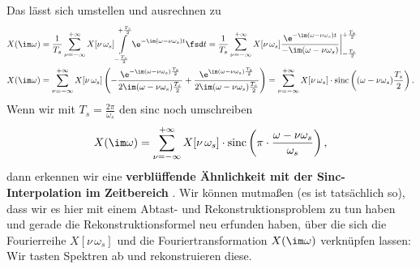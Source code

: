 Das lässt sich umstellen und ausrechnen zu
\begin{align}
&X(\im\omega) = \frac{1}{T_s}\sum_{\nu=-\infty}^{+\infty} X[\nu\,\omega_s]
\int\limits_{-\frac{T_s}{2}}^{+\frac{T_s}{2}}
\e^{-\im (\omega-\nu\omega_s) t} \fsd t=
\frac{1}{T_s}\sum_{\nu=-\infty}^{+\infty} X[\nu\,\omega_s]
\frac{\e^{-\im (\omega-\nu\omega_s) t}}{-\im (\omega-\nu\omega_s)}
\bigg|_{-\frac{T_s}{2}}^{+\frac{T_s}{2}}\\
&X(\im\omega) = \sum_{\nu=-\infty}^{+\infty} X[\nu\,\omega_s]\left(
-\frac{\e^{-\im (\omega-\nu\omega_s)\frac{T_s}{2}}}{2 \im (\omega-\nu\omega_s) \frac{T_s}{2}}+
\frac{\e^{\im (\omega-\nu\omega_s)\frac{T_s}{2}}}{2 \im (\omega-\nu\omega_s) \frac{T_s}{2}}\right)
=
\sum_{\nu=-\infty}^{+\infty} X[\nu\,\omega_s] \cdot
\mathrm{sinc}\left((\omega-\nu\omega_s)\frac{T_s}{2}\right).
\end{align}
Wenn wir mit $T_s=\frac{2\pi}{\omega_s}$ den sinc noch umschreiben
\begin{align}
\label{eq:SamplingFreqSincInterp}
X(\im\omega) = \sum_{\nu=-\infty}^{+\infty} X[\nu\,\omega_s] \cdot
\mathrm{sinc}\left(\pi\cdot\frac{\omega-\nu\omega_s}{\omega_s}\right),
\end{align}
dann erkennen wir eine \textbf{verblüffende Ähnlichkeit mit der Sinc-Interpolation
im Zeitbereich} .
%
Wir können mutmaßen (es ist tatsächlich so), dass wir es hier mit einem
Abtast- und Rekonstruktionsproblem zu tun haben und gerade die Rekonstruktionsformel
neu erfunden haben, über die sich die Fourierreihe $X[\nu\,\omega_s]$
und die Fouriertransformation $X(\im\omega)$
verknüpfen lassen: Wir tasten Spektren ab und rekonstruieren diese.

